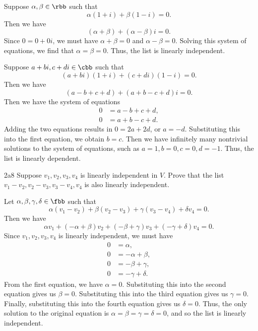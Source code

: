 \begin{solenum}
    \item Suppose $\alpha, \beta \in \rbb$ such that
    \[
    	\alpha(1 + i) + \beta(1 - i) = 0.
    \]
    Then we have
    \[
    	(\alpha + \beta) + (\alpha - \beta)i = 0.
    \]
    Since $0 = 0 + 0i$, we must have $\alpha + \beta = 0$ and $\alpha - \beta = 0$.
	Solving this system of equations, we find that $\alpha = \beta = 0$.
	Thus, the list is linearly independent.
    \item Suppose $a + bi, c + di \in \cbb$ such that
    \[
    	(a + bi)(1 + i) + (c + di)(1 - i) = 0.
    \]
    Then we have
    \[
    	(a - b + c + d) + (a + b - c + d)i = 0.
    \]
    Then we have the system of equations
    \begin{align*}
        0 & = a - b + c + d, \\
        0 & = a + b - c + d.
    \end{align*}
    Adding the two equations results in $0 = 2a + 2d$, or $a = -d$.
	Substituting this into the first equation, we obtain $b = c$.
	Then we have infinitely many nontrivial solutions to the system of equations, such as $a = 1, b = 0, c = 0, d = -1$.
	Thus, the list is linearly dependent.
\end{solenum}

\begin{exercise}{2a8}
    Suppose $v_1, v_2, v_3, v_4$ is linearly independent in $V$.
	Prove that the list
    \(v_1 - v_2, v_2 - v_3, v_3 - v_4, v_4\)
    is also linearly independent.
\end{exercise}

\begin{sol}
    Let $\alpha, \beta, \gamma, \delta \in \fbb$ such that
    \[
    	\alpha(v_1 - v_2) + \beta(v_2 - v_3) + \gamma(v_3 - v_4) + \delta v_4 = 0.
    \]
    Then we have
    \[
    	\alpha v_1 + (-\alpha + \beta)v_2 + (-\beta + \gamma)v_3 + (-\gamma + \delta)v_4 = 0.
    \]
    Since $v_1, v_2, v_3, v_4$ is linearly independent, we must have
    \begin{align*}
        0 & = \alpha, \\
        0 & = -\alpha + \beta, \\
        0 & = -\beta + \gamma, \\
        0 & = -\gamma + \delta.
    \end{align*}
    From the first equation, we have $\alpha = 0$.
	Substituting this into the second equation gives us $\beta = 0$.
	Substituting this into the third equation gives us $\gamma = 0$.
	Finally, substituting this into the fourth equation gives us $\delta = 0$.
	Thus, the only solution to the original equation is $\alpha = \beta = \gamma = \delta = 0$, and so the list is linearly independent.
\end{sol}
 
